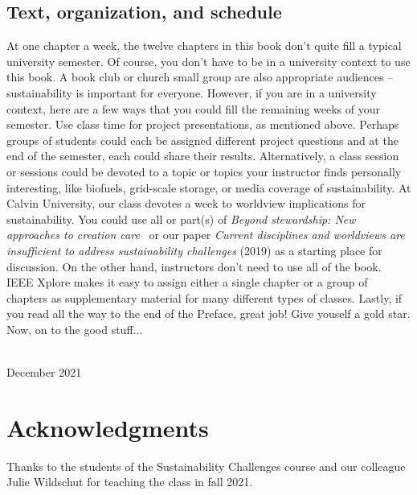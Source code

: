{\section*{Text, organization, and schedule} 
At one chapter a week, the twelve chapters in this book don't quite fill a typical 
university semester. 
Of course, you don't have to be in a university context to use this book. 
A book club or church small group are also appropriate audiences -- sustainability 
is important for everyone. 
However, if you are in a university context, here are a few ways that you could fill the 
remaining weeks of your semester. 
Use class time for project presentations, as mentioned above. 
Perhaps groups of students could each be assigned different project questions and 
at the end of the semester, each could share their results.
Alternatively, a class session or sessions could be devoted to a topic or topics 
your instructor finds personally interesting, like biofuels, grid-scale storage, 
or media coverage of sustainability. 
At Calvin University, our class devotes a week to worldview implications for 
sustainability. 
You could use all or part(s) of \emph{Beyond stewardship: New approaches to 
creation care}~\citep{Warners:2019aa}
or our paper \emph{Current disciplines and worldviews are insufficient
to address sustainability challenges} (2019) as a starting place for discussion. 
On the other hand, instructors don't need to use all of the book. 
IEEE Xplore makes it easy to assign either a single chapter or a group of chapters 
as supplementary material for many different types of classes.
Lastly, if you read all the way to the end of the Preface, great job! 
Give youself a gold star. 
Now, on to the good stuff...


\vspace*{2pc}
\noindent\AUTHORS\\
\noindent December 2021
}

\clearpage




\blankpage

\chapter*{Acknowledgments}
\thispagestyle{plain}

\noindent
Thanks to the students of the Sustainability Challenges course and our colleague 
Julie Wildschut for teaching the class in fall 2021.

